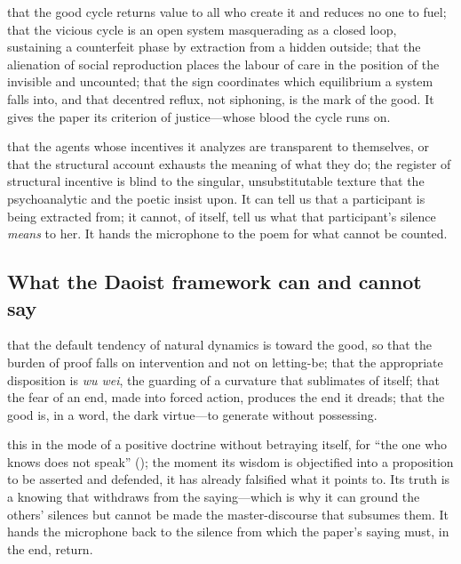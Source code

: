  that the good cycle returns value to all who create it and reduces no one to fuel; that the vicious cycle is an open system masquerading as a closed loop, sustaining a counterfeit phase by extraction from a hidden outside; that the alienation of social reproduction places the labour of care in the position of the invisible and uncounted; that the sign coordinates which equilibrium a system falls into, and that decentred reflux, not siphoning, is the mark of the good. It gives the paper its criterion of justice---whose blood the cycle runs on.

 that the agents whose incentives it analyzes are transparent to themselves, or that the structural account exhausts the meaning of what they do; the register of structural incentive is blind to the singular, unsubstitutable texture that the psychoanalytic and the poetic insist upon. It can tell us that a participant is being extracted from; it cannot, of itself, tell us what that participant's silence \emph{means} to her.  It hands the microphone to the poem for what cannot be counted.

\subsection{What the Daoist framework can and cannot say}
\label{p09:sec:concl-dao}

 that the default tendency of natural dynamics is toward the good, so that the burden of proof falls on intervention and not on letting-be; that the appropriate disposition is \emph{wu wei}, the guarding of a curvature that sublimates of itself; that the fear of an end, made into forced action, produces the end it dreads; that the good is, in a word, the dark virtue---to generate without possessing.

 this in the mode of a positive doctrine without betraying itself, for ``the one who knows does not speak'' (); the moment its wisdom is objectified into a proposition to be asserted and defended, it has already falsified what it points to. Its truth is a knowing that withdraws from the saying---which is why it can ground the others' silences but cannot be made the master-discourse that subsumes them.  It hands the microphone back to the silence from which the paper's saying must, in the end, return.

